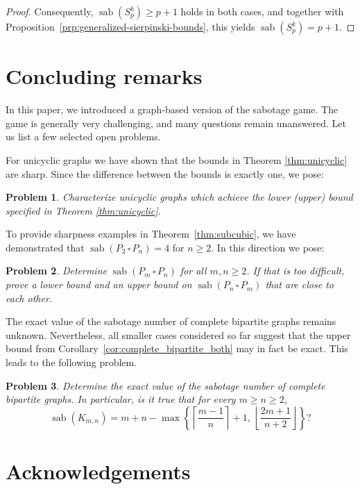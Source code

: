 \documentclass[12pt]{article}
\newtheorem{problem}{Problem}
\newcommand{\cp}{\,\square\,}
\DeclareMathOperator{\sab}{\mathrm{sab}}
\begin{document}
\begin{proof}
Consequently, $\sab(S_p^k)\ge p+1$ holds in both cases, and together with Proposition~\ref{prp:generalized-sierpinski-bounds}, this yields $\sab(S_p^k)=p+1$.
\end{proof}

\section{Concluding remarks}

In this paper, we introduced a graph-based version of the sabotage game. The game is generally very challenging, and many questions remain unanswered. Let us list a few selected open problems. 

For unicyclic graphs we have shown that the bounds in Theorem \ref{thm:unicyclic} are sharp. Since the difference between the bounds is exactly one, we pose:

\begin{problem}
Characterize unicyclic graphs which achieve the lower (upper) bound specified in Theorem \ref{thm:unicyclic}.
\end{problem}

To provide sharpness examples in Theorem~\ref{thm:subcubic}, we have demonstrated that $\sab(P_2\cp P_n) = 4$ for  $n\ge 2$. In this direction we pose:

\begin{problem}
Determine $\sab(P_m\cp P_n)$ for all $m, n\ge 2$. If that is too difficult, prove a lower bound and an upper bound on $\sab(P_n\cp P_m)$ that are close to each other.      
\end{problem}

The exact value of the sabotage number of complete bipartite graphs remains unknown. Nevertheless, all smaller cases considered so far suggest that the upper bound from Corollary~\ref{cor:complete_bipartite_both} may in fact be exact. This leads to the following problem.

\begin{problem}
Determine the exact value of the sabotage number of complete bipartite graphs. In particular, is it true that for every $m \ge n \ge 2$,
$$\sab(K_{m,n})=m+n-\max\left\{\left\lceil\frac{m-1}{n}\right\rceil+1,\,\left\lfloor\frac{2m+1}{n+2}\right\rfloor\right\}?$$
\end{problem}


\section*{Acknowledgements}
\end{document}
